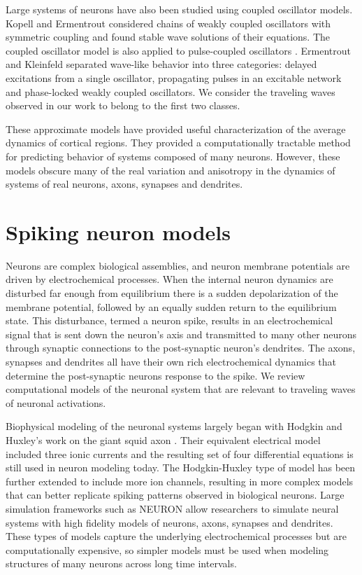 Large systems of neurons have also been studied using coupled oscillator models.
Kopell and Ermentrout \citep{Kopell1986} considered chains of weakly coupled oscillators with symmetric coupling and found stable wave solutions of their equations.
The coupled oscillator model is also applied to pulse-coupled oscillators \citep{Ermentrout1990}\citep{Mirollo1990}. 
Ermentrout and Kleinfeld \citep{ermentrout2001} separated wave-like behavior into three categories: delayed excitations from a single oscillator, 
propagating pulses in an excitable network and phase-locked weakly coupled oscillators.
We consider the traveling waves observed in our work to belong to the first two classes.

These approximate models have provided useful characterization of the average dynamics of cortical regions.
They provided a computationally tractable method for predicting behavior of systems composed of many neurons.
However, these models obscure many of the real variation and anisotropy in the dynamics of systems of real neurons, axons, synapses and dendrites. 

\section{Spiking neuron models}
Neurons are complex biological assemblies, and neuron membrane potentials are driven by electrochemical processes.
When the internal neuron dynamics are disturbed far enough from equilibrium there is a sudden depolarization of the membrane potential, followed by an equally sudden return to the equilibrium state.
This disturbance, termed a neuron spike, results in an electrochemical signal that is sent down the neuron's axis and transmitted to many other neurons through synaptic connections 
to the post-synaptic neuron's dendrites.
The axons, synapses and dendrites all have their own rich electrochemical dynamics that determine the post-synaptic neurons response to the spike.
We review computational models of the neuronal system that are relevant to traveling waves of neuronal activations.

Biophysical modeling of the neuronal systems largely began with Hodgkin and Huxley's work on the giant squid axon \citep{Hodgkin1952}.
Their equivalent electrical model included three ionic currents and the resulting set of four differential equations is still used in neuron modeling today.
The Hodgkin-Huxley type of model has been further extended to include more ion channels\citep{Wilson1999}, resulting in more complex models that can better replicate spiking patterns observed in biological neurons.
Large simulation frameworks such as NEURON allow researchers to simulate neural systems with high fidelity models of neurons, axons, synapses and dendrites.
These types of models capture the underlying electrochemical processes but are computationally expensive, 
so simpler models must be used when modeling structures of many neurons across long time intervals.


